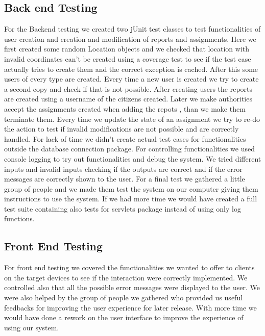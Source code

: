 
\subsection{Back end Testing}
For the Backend testing we created two jUnit test classes to test functionalities of user creation and creation and modification of reports and assignments. Here we first created some random Location objects and we checked that location with invalid coordinates can't be created using a coverage test to see if the test case actually tries to create them and the correct exception is cached. After this some users of every type are created. Every time a new user is created we try to create a second copy and check if that is not possible.
After creating users the reports are created using a username of the citizens created.
Later we make authorities accept the assignments created when adding the repots , than we make them terminate them.
Every time we update the state of an assignment we try to re-do the action to test if invalid modifications are not possible and are correctly handled.
For lack of time we didn't create actual test cases for functionalities outside the database connection package. 
For controlling functionalities we used console logging to try out functionalities and debug the system.
We tried different inputs and invalid inputs checking if the outputs are correct and if the error messages are correctly shown to the user.
For a final test we gathered a little group of people and we made them test the system on our computer giving them instructions to use the system.
If we had more time we would have created a full test suite containing also tests for servlets package instead of using only log functions. 
\subsection{Front End Testing}
For front end testing we covered the functionalities we wanted to offer to clients on the target devices to see if the interaction were correctly implemented. We controlled also that all the possible error messages were displayed to the user.
We were also helped by the group of people we gathered who provided us useful feedbacks for improving the user experience for later release. With more time we would have done a rework on the user interface to improve the experience of using our system.
